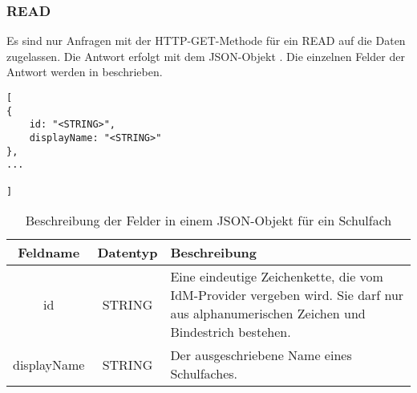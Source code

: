\subsubsection{READ}
\label{sec:end:rest:api:reference-subjects:read}
Es sind nur Anfragen mit der HTTP-GET-Methode für ein READ auf die Daten zugelassen.
Die Antwort erfolgt mit dem JSON-Objekt . Die einzelnen Felder der Antwort werden in  beschrieben.

\begin{lstlisting}[caption={JSON-Antwort für einen GET-Aufruf des Pfads /api/reference-subjects},label={lst:code:end:rest:api:reference-subjects:read:ret},frame=tlrb]
[
{
	id: "<STRING>",
	displayName: "<STRING>"
},
...

]
\end{lstlisting}
\begin{table}[htb]
	\begin{tabularx}{\textwidth}{|c|c|X|}
		\hline
			\textbf{Feldname} & \textbf{Datentyp} & \textbf{Beschreibung} \\ \hline
			id & STRING & Eine eindeutige Zeichenkette, die vom IdM-Provider vergeben wird. Sie darf nur aus alphanumerischen Zeichen und Bindestrich bestehen.\\ \hline
			displayName & STRING & Der ausgeschriebene Name eines Schulfaches. \\ \hline
	\end{tabularx}

		\caption{Beschreibung der Felder in einem JSON-Objekt für ein Schulfach}
		\label{tab:end:rest:api:reference-subjects:read:ret:json}
\end{table}